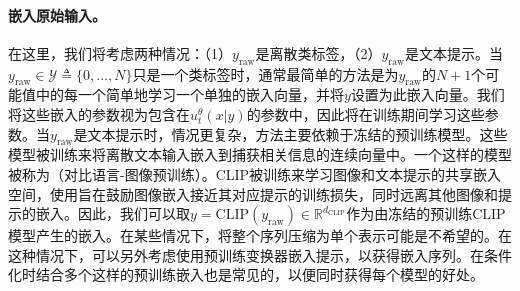 \paragraph{嵌入原始输入。} 在这里，我们将考虑两种情况：（1）$y_{\text{raw}}$是离散类标签，（2）$y_{\text{raw}}$是文本提示。当$y_{\text{raw}} \in \mathcal{Y} \triangleq \{0,\dots, N\}$只是一个类标签时，通常最简单的方法是为$y_{\text{raw}}$的$N+1$个可能值中的每一个简单地学习一个单独的嵌入向量，并将$y$设置为此嵌入向量。我们将这些嵌入的参数视为包含在$u_t^\theta(x|y)$的参数中，因此将在训练期间学习这些参数。当$y_{\text{raw}}$是文本提示时，情况更复杂，方法主要依赖于冻结的预训练模型。这些模型被训练来将离散文本输入嵌入到捕获相关信息的连续向量中。一个这样的模型被称为（对比语言-图像预训练）。CLIP被训练来学习图像和文本提示的共享嵌入空间，使用旨在鼓励图像嵌入接近其对应提示的训练损失，同时远离其他图像和提示的嵌入\cite{clip}。因此，我们可以取$y = \text{CLIP}(y_{\text{raw}}) \in \mathbb{R}^{d_{\text{CLIP}}}$作为由冻结的预训练CLIP模型产生的嵌入。在某些情况下，将整个序列压缩为单个表示可能是不希望的。在这种情况下，可以另外考虑使用预训练变换器嵌入提示，以获得嵌入序列。在条件化时结合多个这样的预训练嵌入也是常见的，以便同时获得每个模型的好处\cite{sd3, moviegen}。

